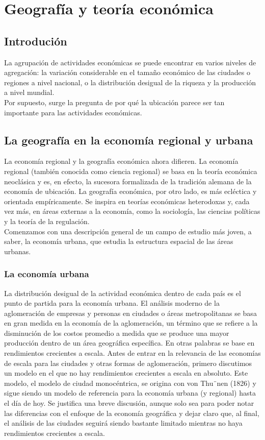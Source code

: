 \chapter{Geografía y teoría económica}

\section{Introdución}

    La agrupación de actividades económicas se puede encontrar en varios niveles de agregación: la variación considerable en el tamaño económico de las ciudades o regiones a nivel nacional, o la distribución desigual de la riqueza y la producción a nivel mundial.\\
    Por supuesto, surge la pregunta de por qué la ubicación parece ser tan importante para las actividades económicas.

\section{La geografía en la economía regional y urbana}
La economía regional y la geografía económica ahora difieren. La economía regional (también conocida como ciencia regional) se basa en la teoría económica neoclásica y es, en efecto, la sucesora formalizada de la tradición alemana de la economía de ubicación. La geografía económica, por otro lado, es más ecléctica y orientada empíricamente. Se inspira en teorías económicas heterodoxas y, cada vez más, en áreas externas a la economía, como la sociología, las ciencias políticas y la teoría de la regulación.\\
Comenzamos con una descripción general de un campo de estudio más joven, a saber, la economía urbana, que estudia la estructura espacial de las áreas urbanas.

\subsection{La economía urbana}
La distribución desigual de la actividad económica dentro de cada país es el punto de partida para la economía urbana. El análisis moderno de la aglomeración de empresas y personas en ciudades o áreas metropolitanas se basa en gran medida en la economía de la aglomeración, un término que se refiere a la disminución de los costos promedio a medida que se produce una mayor producción dentro de un área geográfica específica. En otras palabras se base en rendimientos crecientes a escala. Antes de entrar en la relevancia de las economías de escala para las ciudades y otras formas de aglomeración, primero discutimos un modelo en el que no hay rendimientos crecientes a escala en absoluto. Este modelo, el modelo de ciudad monocéntrica, se origina con von Thu¨nen (1826) y sigue siendo un modelo de referencia para la economía urbana (y regional) hasta el día de hoy. Se justifica una breve discusión, aunque solo sea para poder notar las diferencias con el enfoque de la economía geográfica y dejar claro que, al final, el análisis de las ciudades seguirá siendo bastante limitado mientras no haya rendimientos crecientes a escala.

